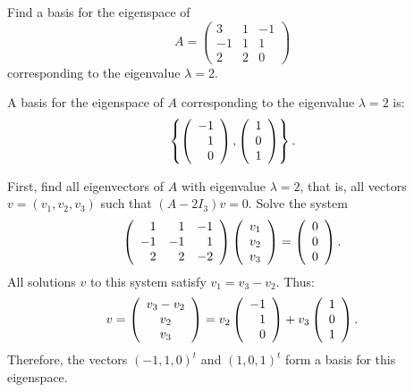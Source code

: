 \documentclass{ximera}
\begin{document}
\begin{exercise} \label{c10.2.2}
Find a basis for the eigenspace of 
\[
A = \left(\begin{array}{rrr} 3 & 1 & -1 \\ -1 & 1 & 1 \\ 2 & 2 & 0 
\end{array}\right)
\]
corresponding to the eigenvalue $\lambda=2$.

\begin{solution}

\ans A basis for the eigenspace of $A$ corresponding to the eigenvalue
$\lambda = 2$ is:
\[
\left\{\left(\begin{array}{r} -1 \\ 1 \\ 0\end{array}\right), \left(\begin{array}{r} 1 \\ 0 \\ 1\end{array}\right)\right\}.
\]

\soln First, find all eigenvectors of $A$ with eigenvalue
$\lambda = 2$, that is, all vectors $v = (v_1,v_2,v_3)$ such
that $(A - 2I_3)v = 0$.  Solve the system
\[
\left(\begin{array}{rrr} 1 & 1 & -1 \\ -1 & -1 & 1 \\ 2 & 2 & -2\end{array}\right)\left(\begin{array}{r} v_1 \\ v_2 \\ v_3\end{array}\right) =
\left(\begin{array}{r} 0 \\ 0 \\ 0\end{array}\right).
\]
All solutions $v$ to this system satisfy $v_1 = v_3 - v_2$.  Thus:
\[
v = \left(\begin{array}{c} v_3 - v_2 \\ v_2 \\ v_3\end{array}\right) = v_2\left(\begin{array}{r} -1 \\ 1 \\ 0\end{array}\right) +
v_3\left(\begin{array}{r} 1 \\ 0 \\ 1\end{array}\right).
\]
Therefore, the vectors $(-1,1,0)^t$ and $(1,0,1)^t$ form a basis
for this eigenspace.

\end{solution}
\end{exercise}
\end{document}
